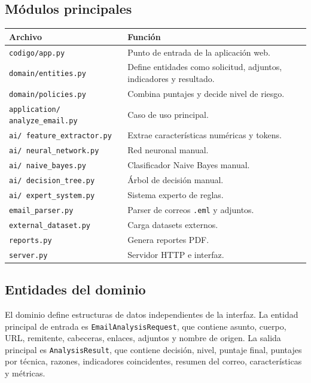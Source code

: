 \documentclass[12pt,letterpaper]{article}
\begin{document}
\subsection{Módulos principales}

\begin{longtable}{p{5cm}p{9cm}}
\toprule
\textbf{Archivo} & \textbf{Función} \\
\midrule
\texttt{codigo/app.py} & Punto de entrada de la aplicación web. \\
\texttt{domain/entities.py} & Define entidades como solicitud, adjuntos, indicadores y resultado. \\
\texttt{domain/policies.py} & Combina puntajes y decide nivel de riesgo. \\
\texttt{application/ analyze\_email.py} & Caso de uso principal. \\
\texttt{ai/ feature\_extractor.py} & Extrae características numéricas y tokens. \\
\texttt{ai/ neural\_network.py} & Red neuronal manual. \\
\texttt{ai/ naive\_bayes.py} & Clasificador Naive Bayes manual. \\
\texttt{ai/ decision\_tree.py} & Árbol de decisión manual. \\
\texttt{ai/ expert\_system.py} & Sistema experto de reglas. \\
\texttt{email\_parser.py} & Parser de correos \texttt{.eml} y adjuntos. \\
\texttt{external\_dataset.py} & Carga datasets externos. \\
\texttt{reports.py} & Genera reportes PDF. \\
\texttt{server.py} & Servidor HTTP e interfaz. \\
\bottomrule
\end{longtable}

\subsection{Entidades del dominio}

El dominio define estructuras de datos independientes de la interfaz. La entidad principal de entrada es \texttt{EmailAnalysisRequest}, que contiene asunto, cuerpo, URL, remitente, cabeceras, enlaces, adjuntos y nombre de origen. La salida principal es \texttt{AnalysisResult}, que contiene decisión, nivel, puntaje final, puntajes por técnica, razones, indicadores coincidentes, resumen del correo, características y métricas.
\end{document}
